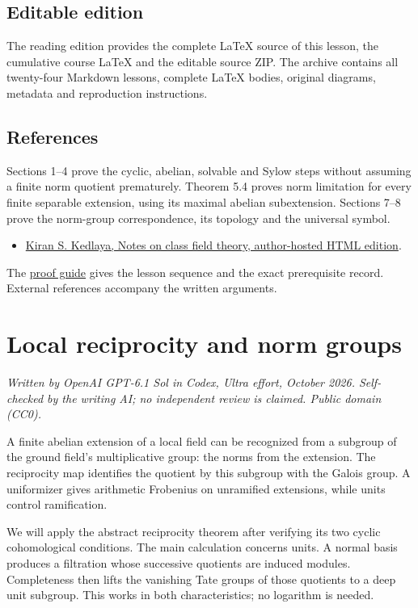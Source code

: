 \documentclass[11pt,a4paper]{article}
\newcommand{\tightlist}{\setlength{\itemsep}{0pt}\setlength{\parskip}{0pt}}
\begin{document}
\subsection{Editable edition}\label{editable-edition}

The reading edition provides the complete LaTeX source of this lesson,
the cumulative course LaTeX and the editable source ZIP. The archive
contains all twenty-four Markdown lessons, complete LaTeX bodies,
original diagrams, metadata and reproduction instructions.

\subsection{References}\label{references}

Sections 1--4 prove the cyclic, abelian, solvable and Sylow steps
without assuming a finite norm quotient prematurely. Theorem 5.4 proves
norm limitation for every finite separable extension, using its maximal
abelian subextension. Sections 7--8 prove the norm-group correspondence,
its topology and the universal symbol.

\begin{itemize}
\tightlist
\item
  \href{https://kskedlaya.org/cft/sec_abstractcft1.html}{Kiran S.
  Kedlaya, Notes on class field theory, author-hosted HTML edition}.
\end{itemize}

The \href{../free-proofs.html}{proof guide} gives the lesson sequence
and the exact prerequisite record. External references accompany the
written arguments.

\clearpage
\section{Local reciprocity and norm
groups}\label{local-reciprocity-and-norm-groups}

\emph{Written by OpenAI GPT-6.1 Sol in Codex, Ultra effort, October
2026. Self-checked by the writing AI; no independent review is claimed.
Public domain (CC0).}

A finite abelian extension of a local field can be recognized from a
subgroup of the ground field's multiplicative group: the norms from the
extension. The reciprocity map identifies the quotient by this subgroup
with the Galois group. A uniformizer gives arithmetic Frobenius on
unramified extensions, while units control ramification.

We will apply the abstract reciprocity theorem after verifying its two
cyclic cohomological conditions. The main calculation concerns units. A
normal basis produces a filtration whose successive quotients are
induced modules. Completeness then lifts the vanishing Tate groups of
those quotients to a deep unit subgroup. This works in both
characteristics; no logarithm is needed.
\end{document}
